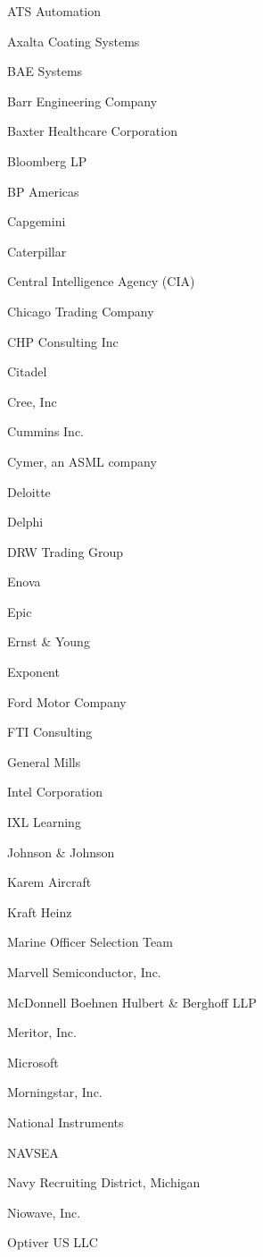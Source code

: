 \documentclass[twoside]{article}
\begin{document}
\begin{center}
\begin{multicols}{5}
\begin{FlushLeft}
\begin{compactitem}
\item ATS Automation
\item Axalta Coating Systems
\item BAE Systems
\item Barr Engineering Company
\item Baxter Healthcare Corporation
\item Bloomberg LP
\item BP Americas
\item Capgemini
\item Caterpillar
\item Central Intelligence Agency (CIA)
\item Chicago Trading Company
\item CHP Consulting Inc
\item Citadel
\item Cree, Inc
\item Cummins Inc.
\item Cymer, an ASML company
\item Deloitte
\item Delphi
\item DRW Trading Group
\item Enova
\item Epic
\item Ernst \& Young
\item Exponent
\item Ford Motor Company
\item FTI Consulting
\item General Mills
\item Intel Corporation
\item IXL Learning
\item Johnson \& Johnson
\item Karem Aircraft
\item Kraft Heinz
\item Marine Officer Selection Team
\item Marvell Semiconductor, Inc.
\item McDonnell Boehnen Hulbert \& Berghoff LLP
\item Meritor, Inc.
\item Microsoft
\item Morningstar, Inc.
\item National Instruments
\item NAVSEA
\item Navy Recruiting District, Michigan
\item Niowave, Inc.
\item Optiver US LLC

\end{compactitem}
\end{FlushLeft}
\end{multicols}
\end{center}
\end{document}
